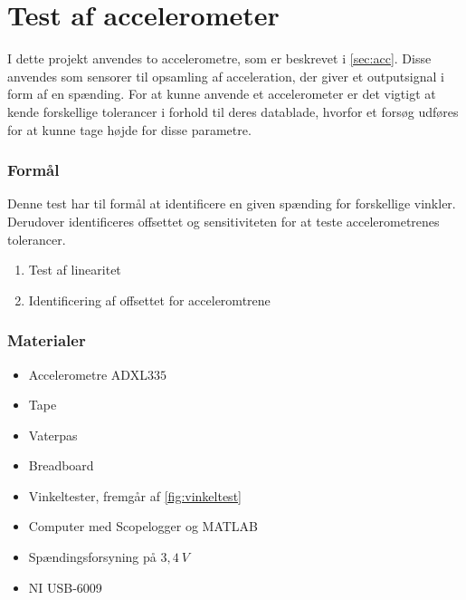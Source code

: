 \chapter{Test af accelerometer} 
\label{sec:test_acc}
I dette projekt anvendes to accelerometre, som er beskrevet i \autoref{sec:acc}. Disse anvendes som sensorer til opsamling af acceleration, der giver et outputsignal i form af en spænding. For at kunne anvende et accelerometer er det vigtigt at kende forskellige tolerancer i forhold til deres datablade, hvorfor et forsøg udføres for at kunne tage højde for disse parametre.

\subsection{Formål}\label{sec:acc_formaal}
Denne test har til formål at identificere en given spænding for forskellige vinkler. Derudover identificeres %
offsettet og sensitiviteten for at teste accelerometrenes tolerancer.

\begin{enumerate}
\item Test af linearitet
\item Identificering af offsettet for acceleromtrene %
\end{enumerate}

\subsection{Materialer}
\begin{itemize}
\item Accelerometre ADXL$335$
\item Tape
\item Vaterpas
\item Breadboard
\item Vinkeltester, fremgår af \autoref{fig:vinkeltest}
\item Computer med Scopelogger og MATLAB
\item Spændingsforsyning på $3,4~V$ 
\item NI USB-6009
\end{itemize}

